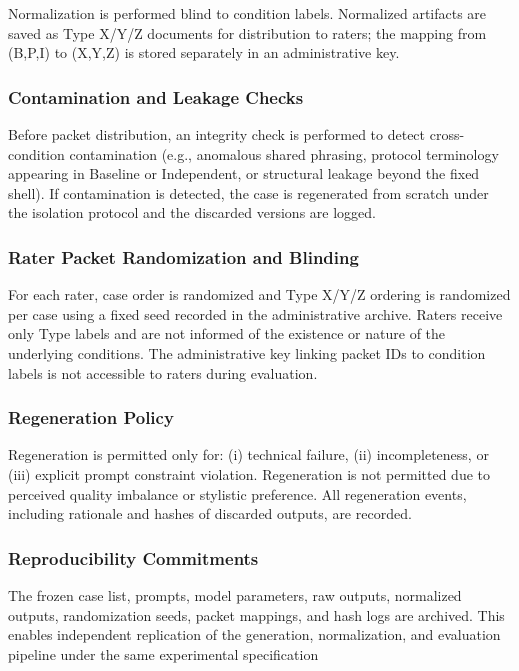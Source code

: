 Normalization is performed blind to condition labels. Normalized artifacts are saved as Type X/Y/Z documents for distribution to raters; the mapping from (B,P,I) to (X,Y,Z) is stored separately in an administrative key.

\subsubsection{Contamination and Leakage Checks}

Before packet distribution, an integrity check is performed to detect cross-condition contamination (e.g., anomalous shared phrasing, protocol terminology appearing in Baseline or Independent, or structural leakage beyond the fixed shell). If contamination is detected, the case is regenerated from scratch under the isolation protocol and the discarded versions are logged.

\subsubsection{Rater Packet Randomization and Blinding}

For each rater, case order is randomized and Type X/Y/Z ordering is randomized per case using a fixed seed recorded in the administrative archive. Raters receive only Type labels and are not informed of the existence or nature of the underlying conditions. The administrative key linking packet IDs to condition labels is not accessible to raters during evaluation.

\subsubsection{Regeneration Policy}

Regeneration is permitted only for: (i) technical failure, (ii) incompleteness, or (iii) explicit prompt constraint violation. Regeneration is not permitted due to perceived quality imbalance or stylistic preference. All regeneration events, including rationale and hashes of discarded outputs, are recorded.

\subsubsection{Reproducibility Commitments}

The frozen case list, prompts, model parameters, raw outputs, normalized outputs, randomization seeds, packet mappings, and hash logs are archived. This enables independent replication of the generation, normalization, and evaluation pipeline under the same experimental specification

